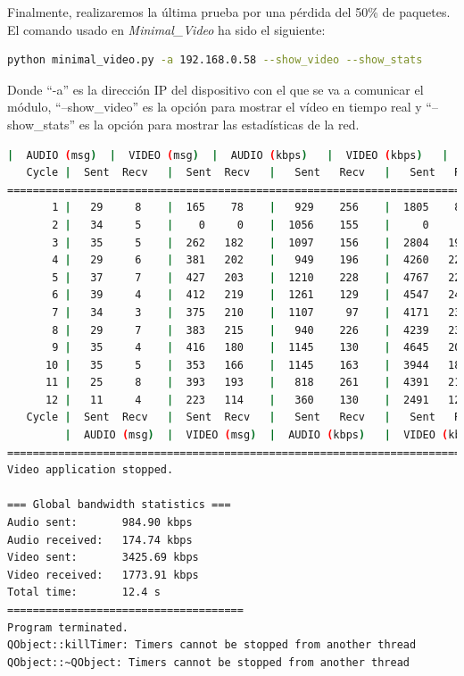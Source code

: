 Finalmente, realizaremos la última prueba por una pérdida del 50\% de paquetes. El comando usado en \textit{Minimal\_Video} ha sido el siguiente:

\begin{lstlisting}[language=bash]
python minimal_video.py -a 192.168.0.58 --show_video --show_stats
\end{lstlisting}
Donde ``-a'' es la dirección IP del dispositivo con el que se va a comunicar el módulo, ``--show\_video'' es la opción para mostrar el vídeo en tiempo real y ``--show\_stats'' es la opción para mostrar las estadísticas de la red.
\vspace{\baselineskip}

\begin{lstlisting}[language=bash,basicstyle=\ttfamily\tiny]
         |  AUDIO (msg)  |  VIDEO (msg)  |  AUDIO (kbps)   |  VIDEO (kbps)   |     CPU (%) 
   Cycle |  Sent  Recv   |  Sent  Recv   |   Sent   Recv   |   Sent   Recv   | Program System
================================================================================================
       1 |   29     8    |  165    78    |   929    256    |  1805    854    |  31    100       
       2 |   34     5    |    0     0    |  1056    155    |     0      0    |  47     74       
       3 |   35     5    |  262   182    |  1097    156    |  2804   1949    |  31     75       
       4 |   29     6    |  381   202    |   949    196    |  4260   2256    |  28     73       
       5 |   37     7    |  427   203    |  1210    228    |  4767   2267    |  25     70       
       6 |   39     4    |  412   219    |  1261    129    |  4547   2418    |  35     70       
       7 |   34     3    |  375   210    |  1107     97    |  4171   2334    |  39     67       
       8 |   29     7    |  383   215    |   940    226    |  4239   2377    |  35     67       
       9 |   35     4    |  416   180    |  1145    130    |  4645   2012    |  37     71       
      10 |   35     5    |  353   166    |  1145    163    |  3944   1854    |  34     72       
      11 |   25     8    |  393   193    |   818    261    |  4391   2158    |  35     66       
      12 |   11     4    |  223   114    |   360    130    |  2491   1275    |  16     42       
   Cycle |  Sent  Recv   |  Sent  Recv   |   Sent   Recv   |   Sent   Recv   | Program System
         |  AUDIO (msg)  |  VIDEO (msg)  |  AUDIO (kbps)   |  VIDEO (kbps)   |     CPU (%) 
===========================================================================================
Video application stopped.

=== Global bandwidth statistics ===
Audio sent:       984.90 kbps
Audio received:   174.74 kbps
Video sent:       3425.69 kbps
Video received:   1773.91 kbps
Total time:       12.4 s
=====================================
Program terminated.
QObject::killTimer: Timers cannot be stopped from another thread
QObject::~QObject: Timers cannot be stopped from another thread
\end{lstlisting}

